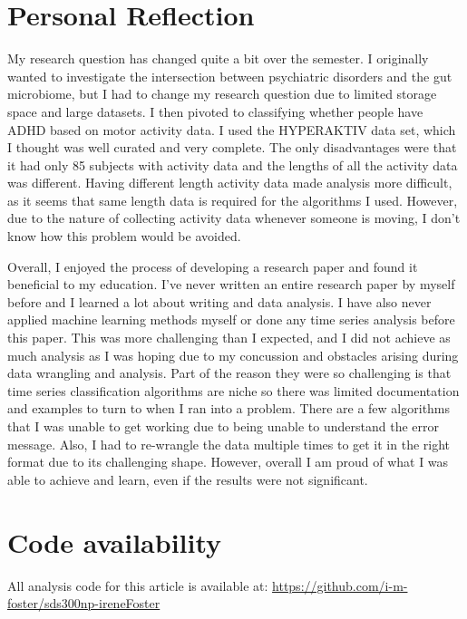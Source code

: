 \documentclass[,article,,moreauthors,pdftex]{mdpi}
\begin{document}
\hypertarget{personal-reflection}{%
\section{Personal Reflection}\label{personal-reflection}}

My research question has changed quite a bit over the semester. I
originally wanted to investigate the intersection between psychiatric
disorders and the gut microbiome, but I had to change my research
question due to limited storage space and large datasets. I then pivoted
to classifying whether people have ADHD based on motor activity data. I
used the HYPERAKTIV data set, which I thought was well curated and very
complete. The only disadvantages were that it had only 85 subjects with
activity data and the lengths of all the activity data was different.
Having different length activity data made analysis more difficult, as
it seems that same length data is required for the algorithms I used.
However, due to the nature of collecting activity data whenever someone
is moving, I don't know how this problem would be avoided.

Overall, I enjoyed the process of developing a research paper and found
it beneficial to my education. I've never written an entire research
paper by myself before and I learned a lot about writing and data
analysis. I have also never applied machine learning methods myself or
done any time series analysis before this paper. This was more
challenging than I expected, and I did not achieve as much analysis as I
was hoping due to my concussion and obstacles arising during data
wrangling and analysis. Part of the reason they were so challenging is
that time series classification algorithms are niche so there was
limited documentation and examples to turn to when I ran into a problem.
There are a few algorithms that I was unable to get working due to being
unable to understand the error message. Also, I had to re-wrangle the
data multiple times to get it in the right format due to its challenging
shape. However, overall I am proud of what I was able to achieve and
learn, even if the results were not significant.

\hypertarget{code-availability}{%
\section{Code availability}\label{code-availability}}

All analysis code for this article is available at:
\url{https://github.com/i-m-foster/sds300np-ireneFoster}
\end{document}
